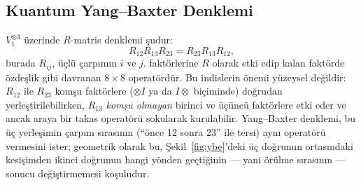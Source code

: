 \documentclass[10pt]{math}
\numberwithin{equation}{section}
\theoremstyle{plain}
\theoremstyle{definition}
\begin{document}
\subsection{Kuantum Yang--Baxter Denklemi}

$V_1^{\otimes 3}$ üzerinde $R$-matris denklemi şudur:
\begin{equation}\label{eq:QYBE}
  R_{12} R_{13} R_{23} = R_{23} R_{13} R_{12},
\end{equation}
burada $R_{ij}$, üçlü çarpımın $i$ ve $j$. faktörlerine $R$ olarak etki edip
kalan faktörde özdeşlik gibi davranan $8\times 8$ operatördür. Bu indislerin
önemi yüzeysel değildir: $R_{12}$ ile $R_{23}$ komşu faktörlere ($\otimes I$
ya da $I\otimes$ biçiminde) doğrudan yerleştirilebilirken, $R_{13}$ \emph{komşu
olmayan} birinci ve üçüncü faktörlere etki eder ve ancak araya bir takas
operatörü sokularak kurulabilir. Yang--Baxter denklemi, bu üç yerleşimin
çarpım sırasının (``önce 12 sonra 23'' ile tersi) aynı operatörü vermesini ister;
geometrik olarak bu, Şekil~\ref{fig:ybe}'deki üç doğrunun ortasındaki kesişimden
ikinci doğrunun hangi yönden geçtiğinin --- yani örülme sırasının --- sonucu
değiştirmemesi koşuludur.
\end{document}

